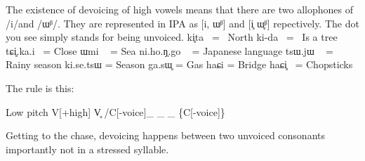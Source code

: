 \par{The existence of devoicing of high vowels means that there are two allophones of \slash i\slash  and \slash ɯᵝ\slash . They are represented in IPA as [i, ɯᵝ] and [i̥ ɯ̥ᵝ] repectively. The dot you see simply stands for being unvoiced. }
ki̥ta  =  North ki-da  =  Is a tree tɕi̥.ka.i  = Close ɯmi   = Sea ni.ho.ŋ̩.go   = Japanese language tsɯ.jɯ   = Rainy season \hfill\break
ki.se.tsɯ = Season ga.sɯ̥ = Gas haɕi = Bridge haɕi̥  = Chopsticks 
\par{ The rule is this: }

\begin{center}
Low pitch V[+high] \textrightarrow  V̥  \slash  C[-voice]\_ \_ \_  \{C[-voice]\} 
\end{center}

\par{ Getting to the chase, devoicing happens between two unvoiced consonants importantly not in a stressed syllable. }
    